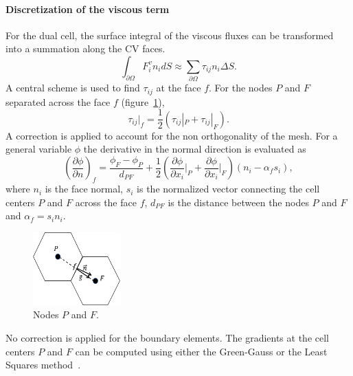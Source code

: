 \paragraph{Discretization of the viscous term}
For the dual cell, the surface integral of the viscous fluxes can be transformed into a summation along the CV faces.
\begin{equation}
\int_{\partial\Omega}F^{v}_in_i dS \approx \sum_{\partial \Omega} \tau_{ij} n_i \Delta S.
\end{equation}
A central scheme is used to find $\tau_{ij}$ at the face $f$.  For the nodes $P$ and $F$ separated across the face $f$ (figure~\ref{fig:nonorthonodes}),
\begin{equation}
\tau_{ij}|_f = \frac{1}{2}\left(\tau_{ij}|_P + \tau_{ij}|_F\right).
\end{equation}
A correction is applied to account for the non orthogonality of the mesh. For a general variable $\phi$ the derivative in the normal direction is evaluated as
\begin{equation}
   \left(\frac{\partial \phi}{\partial n}\right)_f = \frac{\phi_F - \phi_P}{d_{PF}} + \frac{1}{2}\left(\frac{\partial \phi}{\partial x_i}\bigg|_P +\frac{\partial \phi}{\partial x_i}\bigg|_F\right)(n_i - \alpha_f s_i),
    \label{eq:gradrel}
\end{equation}{}
where $n_i$ is the face normal, $s_i$ is the normalized vector connecting the cell centers $P$ and $F$ across the face $f$, $d_{PF}$ is the distance between the nodes $P$ and $F$ and $\alpha_f = s_i n_i$. 
\begin{figure}[h]
\centering
\captionsetup{justification=centering}
 \includegraphics[width=0.3\textwidth]{ch3_su2eqn/figures/noncollinearij.png}
\caption{Nodes $P$ and $F$.}
 \label{fig:nonorthonodes}
\end{figure} 
No correction is applied for the boundary elements. The gradients at the cell centers $P$ and $F$ can be computed using either the Green-Gauss or the Least Squares method~\cite{Moukalled}.


